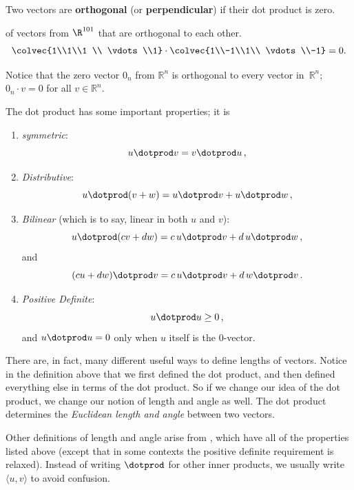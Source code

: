 \begin{definition} 
Two vectors are \hypertarget{orthog}{{\bfseries orthogonal}} (or {\bfseries perpendicular}) if their dot product is zero.
\end{definition} 


\begin{example} of vectors from $\R^{101}$ that are orthogonal to each other.\\
\[
\colvec{1\\1\\1 \\ \vdots \\1} \cdot \colvec{1\\-1\\1\\ \vdots \\-1} =0.
\]
\end{example}

Notice that the zero vector $0_n$ from $\mathbb{R}^n$ is orthogonal to every vector in~$\mathbb{R}^n$; $0_n\cdot v=0$ for all $v \in \mathbb{R}^n$.

\vspace{2mm}\noindent
The dot product has some important properties; it is
\begin{enumerate}
\item  \emph{symmetric}:  
\[u\dotprod v = v\dotprod u\, ,\]
\item \emph{Distributive}:  \[u\dotprod (v+w) = u\dotprod v + u\dotprod w\, ,\]
\item \emph{Bilinear} (which is to say, linear in both $u$ and $v$):  
\[ u\dotprod (cv+dw) = c \, u\dotprod v +d \, u\dotprod w\, ,\] and 
\[(cu+dw)\dotprod v = c\, u\dotprod v + d\, w\dotprod v\, .\]
\item \emph{Positive Definite}: \[u\dotprod u \geq 0\, ,\] and  $u\dotprod u = 0$ only when $u$ itself is the $0$-vector.
\end{enumerate}

There are, in fact, many different useful ways to define lengths of vectors.  Notice in the definition above that we first defined the dot product, and then defined everything else in terms of the dot product.  So if we change our idea of the dot product, we change our notion of length and angle as well.  The dot product determines the \emph{Euclidean length and angle} between two vectors.  

Other definitions of length and angle arise from , which have all of the properties listed above
(except that in some contexts the positive definite requirement is relaxed). Instead of writing $\dotprod$ for other inner products, we usually write $\langle u,v \rangle$ to avoid confusion.

